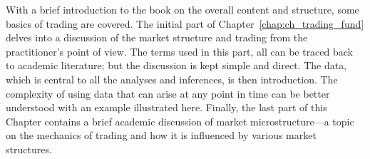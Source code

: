 
With a brief introduction to the book on the overall content and structure, some basics of trading are covered. The initial part of Chapter~\ref{chap:ch_trading_fund} delves into a discussion of the market structure and trading from the practitioner's point of view. The terms used in this part, all can be traced back to academic literature; but the discussion is kept simple and direct. The data, which is central to all the analyses and inferences, is then introduction. The complexity of using data that can arise at any point in time can be better understood with an example illustrated here. Finally, the last part of this Chapter contains a brief academic discussion of market microstructure---a topic on the mechanics of trading and how it is influenced by various market structures.
